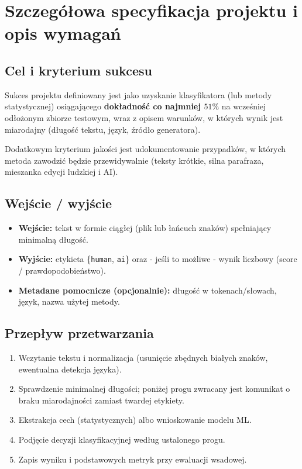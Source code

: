 \section{Szczegółowa specyfikacja projektu i opis wymagań}

\subsection{Cel i kryterium sukcesu}

Sukces projektu definiowany jest jako uzyskanie klasyfikatora (lub metody statystycznej) osiągającego \textbf{dokładność co najmniej $51\%$} na wcześniej odłożonym zbiorze testowym, wraz z opisem warunków, w których wynik jest miarodajny (długość tekstu, język, źródło generatora).

Dodatkowym kryterium jakości jest udokumentowanie przypadków, w których metoda zawodzić będzie przewidywalnie (teksty krótkie, silna parafraza, mieszanka edycji ludzkiej i AI).

\subsection{Wejście / wyjście}

\begin{itemize}
	\item \textbf{Wejście:} tekst w formie ciągłej (plik lub łańcuch znaków) spełniający minimalną długość.
	\item \textbf{Wyjście:} etykieta \{\texttt{human}, \texttt{ai}\} oraz - jeśli to możliwe - wynik liczbowy (score / prawdopodobieństwo).
	\item \textbf{Metadane pomocnicze (opcjonalnie):} długość w tokenach/słowach, język, nazwa użytej metody.
\end{itemize}

\subsection{Przepływ przetwarzania}

\begin{enumerate}
	\item Wczytanie tekstu i normalizacja (usunięcie zbędnych białych znaków, ewentualna detekcja języka).
	\item Sprawdzenie minimalnej długości; poniżej progu zwracany jest komunikat o braku miarodajności zamiast twardej etykiety.
	\item Ekstrakcja cech (statystycznych) albo wnioskowanie modelu ML.
	\item Podjęcie decyzji klasyfikacyjnej według ustalonego progu.
	\item Zapis wyniku i podstawowych metryk przy ewaluacji wsadowej.
\end{enumerate}

